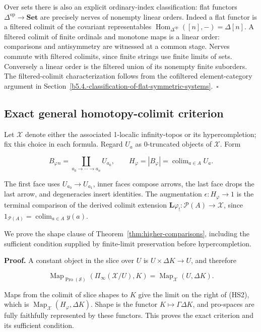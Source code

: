 \documentclass[11pt,a4paper]{article}
\theoremstyle{definition}
\begin{document}
Over sets there is also an explicit ordinary-index classification: flat
functors \(\Delta^{\mathrm{op}}\to\mathbf{Set}\) are precisely nerves of
nonempty linear orders. Indeed a flat functor is a filtered colimit of
the covariant representables
\(\operatorname{Hom}_{\Delta^{\mathrm{op}}}([n],-)=\Delta[n]\). A
filtered colimit of finite ordinals and monotone maps is a linear order:
comparisons and antisymmetry are witnessed at a common stage. Nerves
commute with filtered colimits, since finite strings use finite limits
of sets. Conversely a linear order is the filtered union of its nonempty
finite suborders. The filtered-colimit characterization follows from the
cofiltered element-category argument in Section~\ref{b5.4.-classification-of-flat-symmetric-systems}.~\(\square\)

\subsection{Exact general homotopy-colimit
criterion}\label{b5.6.-exact-general-homotopy-colimit-criterion}

Let
\(\mathscr X\) denote either the associated 1-localic infinity-topos or
its hypercompletion; fix this choice in each formula. Regard \(U_a\) as
0-truncated objects of \(\mathscr X\). Form

\[B_\varphi{}_n=\coprod_{a_0\to\cdots\to a_n}U_{a_0},\qquad
H_\varphi=|B_\varphi|=\operatorname{colim}_{a\in A}U_a.\]

The first face uses \(U_{a_0}\to U_{a_1}\), inner faces compose arrows,
the last face drops the last arrow, and degeneracies insert identities.
The augmentation \(\epsilon:H_\varphi\to1\) is the terminal comparison
of the derived colimit extension
\(\mathbf L\varphi_!:\mathcal P(A)\to\mathscr X\), since
\(1_{\mathcal P(A)}=\operatorname{colim}_{a\in A}y(a)\).

We prove the shape clause of Theorem~\ref{thm:higher-comparisons}, including the sufficient condition supplied by finite-limit preservation before hypercompletion.

\textbf{Proof.} A constant object in the slice over \(U\) is
\(U\times\Delta K\to U\), and therefore

\[\operatorname{Map}_{\operatorname{Pro}(\mathcal S)}(\Pi_\infty(\mathscr X/U),K)
=\operatorname{Map}_{\mathscr X}(U,\Delta K).\]

Maps from the colimit of slice shapes to \(K\) give the limit on the
right of (HS2), which is
\(\operatorname{Map}_{\mathscr X}(H_\varphi,\Delta K)\). Shape is the
functor \(K\mapsto\Gamma\Delta K\), and pro-spaces are fully faithfully
represented by these functors. This proves the exact criterion and its
sufficient condition.
\end{document}
